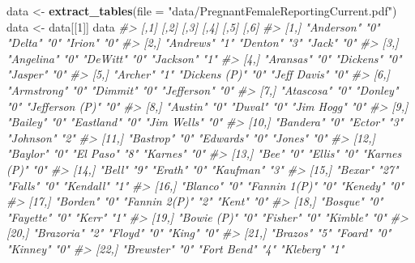 \documentclass[
  12pt,
]{book}
\newenvironment{Shaded}{\begin{snugshade}}{\end{snugshade}}
\newcommand{\CommentTok}[1]{\textcolor[rgb]{0.37,0.37,0.37}{\textit{#1}}}
\newcommand{\DataTypeTok}[1]{\textcolor[rgb]{0.27,0.27,0.27}{#1}}
\newcommand{\DecValTok}[1]{\textcolor[rgb]{0.06,0.06,0.06}{#1}}
\newcommand{\KeywordTok}[1]{\textcolor[rgb]{0.27,0.27,0.27}{\textbf{#1}}}
\newcommand{\NormalTok}[1]{#1}
\newcommand{\StringTok}[1]{\textcolor[rgb]{0.5,0.5,0.5}{#1}}
\begin{document}
\begin{Shaded}
\begin{Highlighting}[]
\NormalTok{data \textless{}{-}}\StringTok{ }\KeywordTok{extract\_tables}\NormalTok{(}\DataTypeTok{file =} \StringTok{"data/PregnantFemaleReportingCurrent.pdf"}\NormalTok{)}
\NormalTok{data \textless{}{-}}\StringTok{ }\NormalTok{data[[}\DecValTok{1}\NormalTok{]]}
\NormalTok{data}
\CommentTok{\#\textgreater{}       [,1]            [,2] [,3]          [,4] [,5]            [,6]}
\CommentTok{\#\textgreater{}  [1,] "Anderson"      "0"  "Delta"       "0"  "Irion"         "0" }
\CommentTok{\#\textgreater{}  [2,] "Andrews"       "1"  "Denton"      "3"  "Jack"          "0" }
\CommentTok{\#\textgreater{}  [3,] "Angelina"      "0"  "DeWitt"      "0"  "Jackson"       "1" }
\CommentTok{\#\textgreater{}  [4,] "Aransas"       "0"  "Dickens"     "0"  "Jasper"        "0" }
\CommentTok{\#\textgreater{}  [5,] "Archer"        "1"  "Dickens (P)" "0"  "Jeff Davis"    "0" }
\CommentTok{\#\textgreater{}  [6,] "Armstrong"     "0"  "Dimmit"      "0"  "Jefferson"     "0" }
\CommentTok{\#\textgreater{}  [7,] "Atascosa"      "0"  "Donley"      "0"  "Jefferson (P)" "0" }
\CommentTok{\#\textgreater{}  [8,] "Austin"        "0"  "Duval"       "0"  "Jim Hogg"      "0" }
\CommentTok{\#\textgreater{}  [9,] "Bailey"        "0"  "Eastland"    "0"  "Jim Wells"     "0" }
\CommentTok{\#\textgreater{} [10,] "Bandera"       "0"  "Ector"       "3"  "Johnson"       "2" }
\CommentTok{\#\textgreater{} [11,] "Bastrop"       "0"  "Edwards"     "0"  "Jones"         "0" }
\CommentTok{\#\textgreater{} [12,] "Baylor"        "0"  "El Paso"     "8"  "Karnes"        "0" }
\CommentTok{\#\textgreater{} [13,] "Bee"           "0"  "Ellis"       "0"  "Karnes (P)"    "0" }
\CommentTok{\#\textgreater{} [14,] "Bell"          "9"  "Erath"       "0"  "Kaufman"       "3" }
\CommentTok{\#\textgreater{} [15,] "Bexar"         "27" "Falls"       "0"  "Kendall"       "1" }
\CommentTok{\#\textgreater{} [16,] "Blanco"        "0"  "Fannin 1(P)" "0"  "Kenedy"        "0" }
\CommentTok{\#\textgreater{} [17,] "Borden"        "0"  "Fannin 2(P)" "2"  "Kent"          "0" }
\CommentTok{\#\textgreater{} [18,] "Bosque"        "0"  "Fayette"     "0"  "Kerr"          "1" }
\CommentTok{\#\textgreater{} [19,] "Bowie (P)"     "0"  "Fisher"      "0"  "Kimble"        "0" }
\CommentTok{\#\textgreater{} [20,] "Brazoria"      "2"  "Floyd"       "0"  "King"          "0" }
\CommentTok{\#\textgreater{} [21,] "Brazos"        "5"  "Foard"       "0"  "Kinney"        "0" }
\CommentTok{\#\textgreater{} [22,] "Brewster"      "0"  "Fort Bend"   "4"  "Kleberg"       "1" }

\end{Highlighting}
\end{Shaded}
\end{document}
